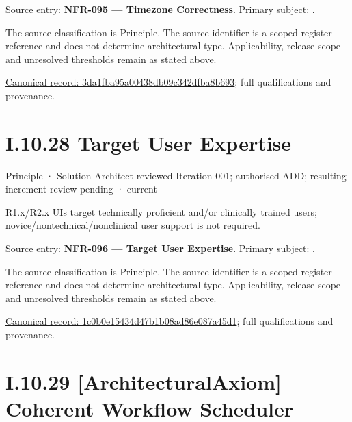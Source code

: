 Source entry: \textbf{NFR-095 — Timezone Correctness}. Primary subject: \texttt{}.



The source classification is Principle. The source identifier is a scoped register reference and does not determine architectural type. Applicability, release scope and unresolved thresholds remain as stated above.


{\footnotesize \href{../../../../../../../continuum/motivation/principle/3da1fba95a00438db09c342dfba8b693.md}{Canonical record: 3da1fba95a00438db09c342dfba8b693}; full qualifications and provenance.}\par
\section*{I.10.28 Target User Expertise}
\label{navigation:I.10.28}

\label{element:1c0b0e15434d47b1b08ad86e087a45d1}
{\small Principle · Solution Architect-reviewed Iteration 001; authorised ADD; resulting increment review pending · current}\par

R1.x/R2.x UIs target technically proficient and/or clinically trained users; novice/nontechnical/nonclinical user support is not required.



Source entry: \textbf{NFR-096 — Target User Expertise}. Primary subject: \texttt{}.



The source classification is Principle. The source identifier is a scoped register reference and does not determine architectural type. Applicability, release scope and unresolved thresholds remain as stated above.


{\footnotesize \href{../../../../../../../continuum/motivation/principle/1c0b0e15434d47b1b08ad86e087a45d1.md}{Canonical record: 1c0b0e15434d47b1b08ad86e087a45d1}; full qualifications and provenance.}\par
\section*{I.10.29 [ArchitecturalAxiom] Coherent Workflow Scheduler}
\label{navigation:I.10.29}

